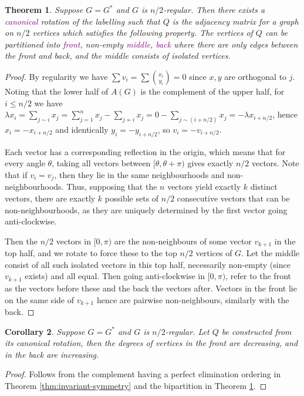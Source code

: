\documentclass[11pt]{article}
\newcommand{\purp}[1]{\textcolor{purple}{#1}}
\newtheorem{thm}{Theorem}[section]
\newtheorem{cor}[thm]{Corollary}
\begin{document}
\begin{thm}\label{thm:invariant-bipartite}
    Suppose $G = G^*$ and $G$ is $n/2$-regular. Then there exists a \purp{canonical} rotation of the labelling such that $Q$ is the adjacency matrix for a graph on $n/2$ vertices which satisfies the following property. The vertices of $Q$ can be partitioned into \purp{front}, non-empty \purp{middle}, \purp{back} where there are only edges between the front and back, and the middle consists of isolated vertices.
\end{thm}
\begin{proof}
    By regularity we have $\sum v_i = \sum \binom{x_i}{y_i} = 0$ since $x,y$ are orthogonal to $j$. Noting that the lower half of $A(G)$ is the complement of the upper half, for $i \le n/2$ we have $\lambda x_i = \sum_{j \sim i} x_j = \sum_{j = 1}^n x_j - \sum_{j \not \sim i} x_j = 0 - \sum_{j \sim (i + n/2)} x_j = -\lambda x_{i + n/2}$, hence $x_i = -x_{i+n/2}$ and identically $y_i = -y_{i+n/2}$, so $v_i = -v_{i+n/2}$. 

    Each vector has a corresponding reflection in the origin, which means that for every angle $\theta$, taking all vectors between $[\theta, \theta+\pi)$ gives exactly $n/2$ vectors. Note that if $v_i = v_j$, then they lie in the same neighbourhoods and non-neighbourhoods. Thus, supposing that the $n$ vectors yield exactly $k$ distinct vectors, there are exactly $k$ possible sets of $n/2$ consecutive vectors that can be non-neighbourhoods, as they are uniquely determined by the first vector going anti-clockwise. 

    Then the $n/2$ vectors in $[0, \pi)$ are the non-neighbours of some vector $v_{k+1}$ in the top half, and we rotate to force these to the top $n/2$ vertices of $G$. Let the middle consist of all such isolated vectors in this top half, necessarily non-empty (since $v_{k+1}$ exists) and all equal. Then going anti-clockwise in $[0, \pi)$, refer to the front as the vectors before these and the back the vectors after. Vectors in the front lie on the same side of $v_{k+1}$ hence are pairwise non-neighbours, similarly with the back.
\end{proof}

\begin{cor}\label{cor:invariant-degrees}
    Suppose $G = G^*$ and $G$ is $n/2$-regular. Let $Q$ be constructed from its canonical rotation, then the degrees of vertices in the front are decreasing, and in the back are increasing.
\end{cor}
\begin{proof}
    Follows from the complement having a perfect elimination ordering in Theorem \ref{thm:invariant-symmetry} and the bipartition in Theorem \ref{thm:invariant-bipartite}.
\end{proof}
\end{document}
